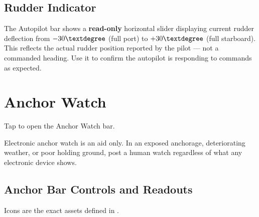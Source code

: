 \section{Rudder Indicator}

The Autopilot bar shows a \textbf{read-only} horizontal slider displaying current
rudder deflection from $-30\textdegree$ (full port) to $+30\textdegree$ (full
starboard).
This reflects the actual rudder position reported by the pilot ---
not a commanded heading.
Use it to confirm the autopilot is responding to commands as expected.

\chapter{Anchor Watch}
\label{ch:anchor}

Tap  to open the Anchor Watch bar.

\begin{warningbox}
Electronic anchor watch is an aid only.
In an exposed anchorage, deteriorating weather, or poor holding ground,
post a human watch regardless of what any electronic device shows.
\end{warningbox}


\section{Anchor Bar Controls and Readouts}

Icons are the exact assets defined in .

